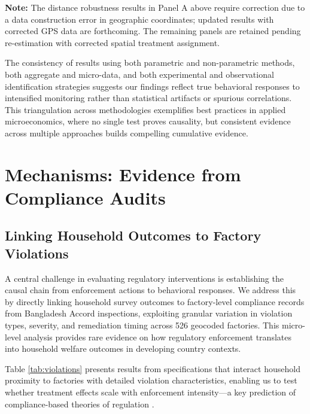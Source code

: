 \documentclass[12pt]{article}
\begin{document}

\textbf{Note:} The distance robustness results in Panel A above require correction due to a data construction error in geographic coordinates; updated results with corrected GPS data are forthcoming. The remaining panels are retained pending re-estimation with corrected spatial treatment assignment.

The consistency of results using both parametric and non-parametric methods, both aggregate and micro-data, and both experimental and observational identification strategies suggests our findings reflect true behavioral responses to intensified monitoring rather than statistical artifacts or spurious correlations. This triangulation across methodologies exemplifies best practices in applied microeconomics, where no single test proves causality, but consistent evidence across multiple approaches builds compelling cumulative evidence.


\section{Mechanisms: Evidence from Compliance Audits}

\subsection{Linking Household Outcomes to Factory Violations}

A central challenge in evaluating regulatory interventions is establishing the causal chain from enforcement actions to behavioral responses. We address this by directly linking household survey outcomes to factory-level compliance records from Bangladesh Accord inspections, exploiting granular variation in violation types, severity, and remediation timing across 526 geocoded factories. This micro-level analysis provides rare evidence on how regulatory enforcement translates into household welfare outcomes in developing country contexts.

Table \ref{tab:violations} presents results from specifications that interact household proximity to factories with detailed violation characteristics, enabling us to test whether treatment effects scale with enforcement intensity—a key prediction of compliance-based theories of regulation \citep{becker1968crime, polinsky2007theory}.
\end{document}
